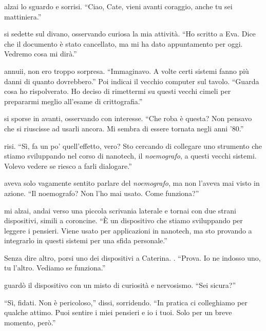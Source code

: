 \begin{dialogue}
 alzai lo sguardo e sorrisi. \enquote{Ciao, Cate, vieni avanti coraggio, anche tu sei mattiniera.}

 si sedette sul divano, osservando curiosa la mia attività. \enquote{Ho scritto a Eva. Dice che il documento è stato cancellato, ma mi ha dato appuntamento per oggi. Vedremo cosa mi dirà.}

 annuii, non ero troppo sorpresa. \enquote{Immaginavo. A volte certi sistemi fanno più danni di quanto dovrebbero.} Poi indicai il vecchio computer sul tavolo. \enquote{Guarda cosa ho rispolverato. Ho deciso di rimettermi su questi vecchi cimeli per prepararmi meglio all'esame di crittografia.}

 si sporse in avanti, osservando con interesse. \enquote{Che roba è questa? Non pensavo che si riuscisse ad usarli ancora. Mi sembra di essere tornata negli anni '80.}

 risi. \enquote{Sì, fa un po' quell'effetto, vero? Sto cercando di collegare uno strumento che stiamo sviluppando nel corso di nanotech, il \emph{noemografo}, a questi vecchi sistemi. Volevo vedere se riesco a farli dialogare.}

 aveva solo vagamente sentito parlare del \emph{noemografo}, ma non l'aveva mai visto in azione. \enquote{Il noemografo? Non l'ho mai usato. Come funziona?}

 mi alzai, andai verso una piccola scrivania laterale e tornai con due strani dispositivi, simili a coroncine. \enquote{È un dispositivo che stiamo sviluppando per leggere i pensieri. Viene usato per applicazioni in nanotech, ma sto provando a integrarlo in questi sistemi per una sfida personale.}

Senza dire altro, porsi uno dei dispositivi a Caterina.
. \enquote{Prova. Io ne indosso uno, tu l'altro. Vediamo se funziona.}

 guardò il dispositivo con un misto di curiosità e nervosismo. \enquote{Sei sicura?}

\enquote{Sì, fidati. Non è pericoloso,} dissi, sorridendo. \enquote{In pratica ci colleghiamo per qualche attimo. Puoi sentire i miei pensieri e io i tuoi. Solo per un breve momento, però.}
\end{dialogue}

